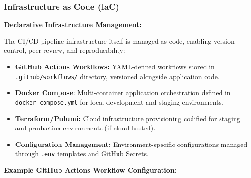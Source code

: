 \documentclass[12pt,a4paper]{article}
\begin{document}
\subsubsection{Infrastructure as Code (IaC)}

\textbf{Declarative Infrastructure Management:}

The CI/CD pipeline infrastructure itself is managed as code, enabling version control, peer review, and reproducibility:

\begin{itemize}[leftmargin=2em, itemsep=6pt]
    \item \textbf{GitHub Actions Workflows:} YAML-defined workflows stored in \texttt{.github/workflows/} directory, versioned alongside application code.
    \item \textbf{Docker Compose:} Multi-container application orchestration defined in \texttt{docker-compose.yml} for local development and staging environments.
    \item \textbf{Terraform/Pulumi:} Cloud infrastructure provisioning codified for staging and production environments (if cloud-hosted).
    \item \textbf{Configuration Management:} Environment-specific configurations managed through \texttt{.env} templates and GitHub Secrets.
\end{itemize}

\vspace{0.5em}

\textbf{Example GitHub Actions Workflow Configuration:}
\end{document}
